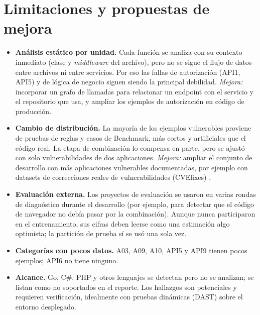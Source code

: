 \documentclass[12pt,a4paper]{article}
\begin{document}
\section{Limitaciones y propuestas de mejora}
\begin{itemize}
  \item \textbf{Análisis estático por unidad.} Cada función se analiza con su contexto inmediato (clase y \emph{middleware} del archivo), pero no se sigue el flujo de datos entre archivos ni entre servicios. Por eso las fallas de autorización (API1, API5) y de lógica de negocio siguen siendo la principal debilidad. \emph{Mejora:} incorporar un grafo de llamadas para relacionar un endpoint con el servicio y el repositorio que usa, y ampliar los ejemplos de autorización en código de producción.
  \item \textbf{Cambio de distribución.} La mayoría de los ejemplos vulnerables proviene de pruebas de reglas y casos de Benchmark, más cortos y artificiales que el código real. La etapa de combinación lo compensa en parte, pero se ajustó con solo \devPositivas{} vulnerabilidades de dos aplicaciones. \emph{Mejora:} ampliar el conjunto de desarrollo con más aplicaciones vulnerables documentadas, por ejemplo con datasets de correcciones reales de vulnerabilidades (CVEfixes) \cite{cvefixes}.
  \item \textbf{Evaluación externa.} Los proyectos de evaluación se usaron en varias rondas de diagnóstico durante el desarrollo (por ejemplo, para detectar que el código de navegador no debía pasar por la combinación). Aunque nunca participaron en el entrenamiento, sus cifras deben leerse como una estimación algo optimista; la partición de prueba sí se usó una sola vez.
  \item \textbf{Categorías con pocos datos.} A03, A09, A10, API5 y API9 tienen pocos ejemplos; API6 no tiene ninguno.
  \item \textbf{Alcance.} Go, C\#, PHP y otros lenguajes se detectan pero no se analizan; se listan como no soportados en el reporte. Los hallazgos son potenciales y requieren verificación, idealmente con pruebas dinámicas (DAST) sobre el entorno desplegado.
\end{itemize}

\end{document}
